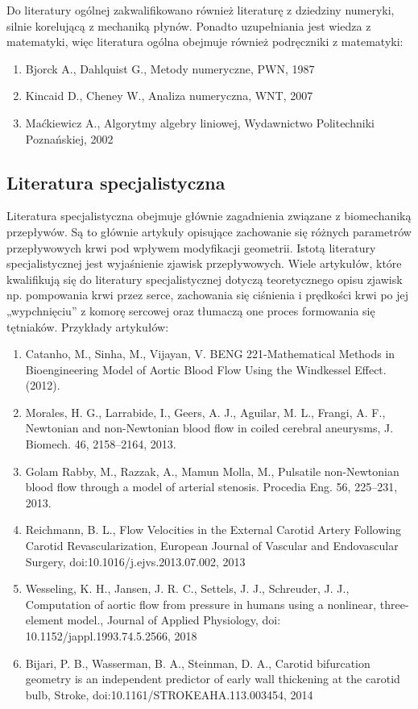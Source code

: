 \documentclass[11pt]{article} %
\begin{document}
Do literatury ogólnej zakwalifikowano również literaturę z dziedziny numeryki, silnie korelującą z mechaniką płynów. Ponadto uzupełniania jest wiedza z matematyki, więc literatura ogólna obejmuje również podręczniki z matematyki:
\begin{enumerate}
\item Bjorck A., Dahlquist G., Metody numeryczne, PWN, 1987
\item Kincaid D., Cheney W., Analiza numeryczna, WNT, 2007
\item Maćkiewicz A., Algorytmy algebry liniowej, Wydawnictwo Politechniki Poznańskiej, 2002
\end{enumerate}


\subsection{Literatura specjalistyczna} %

Literatura specjalistyczna obejmuje głównie zagadnienia związane z biomechaniką przepływów. Są to głównie artykuły opisujące zachowanie się różnych parametrów przepływowych krwi pod wpływem modyfikacji geometrii. Istotą literatury specjalistycznej jest  wyjaśnienie zjawisk przepływowych. Wiele artykułów, które kwalifikują się do literatury specjalistycznej dotyczą teoretycznego opisu zjawisk np. pompowania krwi przez serce, zachowania się ciśnienia i prędkości krwi po jej „wypchnięciu” z komorę sercowej oraz tłumaczą one proces formowania się tętniaków. Przykłady artykułów: 

\begin{enumerate}
\item Catanho, M., Sinha, M., Vijayan, V. BENG 221-Mathematical Methods in Bioengineering Model of Aortic Blood Flow Using the Windkessel Effect. (2012).
\item Morales, H. G., Larrabide, I., Geers, A. J., Aguilar, M. L., Frangi, A. F., Newtonian and non-Newtonian blood flow in coiled cerebral aneurysms, J. Biomech. 46, 2158–2164, 2013.
\item Golam Rabby, M., Razzak, A., Mamun Molla, M., Pulsatile non-Newtonian blood flow through a model of arterial stenosis. Procedia Eng. 56, 225–231, 2013.
\item Reichmann, B. L., Flow Velocities in the External Carotid Artery Following Carotid Revascularization, European Journal of Vascular and Endovascular Surgery, doi:10.1016/j.ejvs.2013.07.002, 2013
\item Wesseling, K. H., Jansen, J. R. C., Settels, J. J., Schreuder, J. J., Computation of aortic flow from pressure in humans using a nonlinear, three-element model., Journal of Applied Physiology, doi: 10.1152/jappl.1993.74.5.2566, 2018
\item Bijari, P. B., Wasserman, B. A., Steinman, D. A., Carotid bifurcation geometry is an independent predictor of early wall thickening at the carotid bulb, Stroke, doi:10.1161/STROKEAHA.113.003454, 2014
\end{enumerate}
\end{document}
